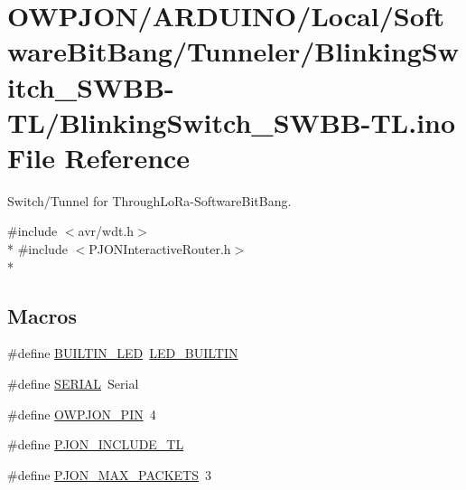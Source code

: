\hypertarget{BlinkingSwitch__SWBB-TL_8ino}{\section{O\-W\-P\-J\-O\-N/\-A\-R\-D\-U\-I\-N\-O/\-Local/\-Software\-Bit\-Bang/\-Tunneler/\-Blinking\-Switch\-\_\-\-S\-W\-B\-B-\/\-T\-L/\-Blinking\-Switch\-\_\-\-S\-W\-B\-B-\/\-T\-L.ino File Reference}
\label{BlinkingSwitch__SWBB-TL_8ino}
}


Switch/\-Tunnel for Through\-Lo\-Ra-\/\-Software\-Bit\-Bang.  


{\ttfamily \#include $<$avr/wdt.\-h$>$}\\*
{\ttfamily \#include $<$P\-J\-O\-N\-Interactive\-Router.\-h$>$}\\*
\subsection*{Macros}
\begin{DoxyCompactItemize}
\item 
\#define \hyperlink{BlinkingSwitch__SWBB-TL_8ino_a4a71aecac635579082c10addb16df4a0}{B\-U\-I\-L\-T\-I\-N\-\_\-\-L\-E\-D}~\hyperlink{Helvetiny__Blink__CDC_8ino_a450a7c16ead7b3c7b882536b08f30a00}{L\-E\-D\-\_\-\-B\-U\-I\-L\-T\-I\-N}
\item 
\#define \hyperlink{BlinkingSwitch__SWBB-TL_8ino_aae3f0b4211ba45d265973d40ccbb5fd1}{S\-E\-R\-I\-A\-L}~Serial
\item 
\#define \hyperlink{BlinkingSwitch__SWBB-TL_8ino_a34fea28a7531677453da5e072f172a78}{O\-W\-P\-J\-O\-N\-\_\-\-P\-I\-N}~4
\item 
\#define \hyperlink{BlinkingSwitch__SWBB-TL_8ino_aeebf956fc71944a6237c3af6a038ff70}{P\-J\-O\-N\-\_\-\-I\-N\-C\-L\-U\-D\-E\-\_\-\-T\-L}
\item 
\#define \hyperlink{BlinkingSwitch__SWBB-TL_8ino_af093da5eac99580be6ba61b4dc79f2c1}{P\-J\-O\-N\-\_\-\-M\-A\-X\-\_\-\-P\-A\-C\-K\-E\-T\-S}~3
\end{DoxyCompactItemize}
